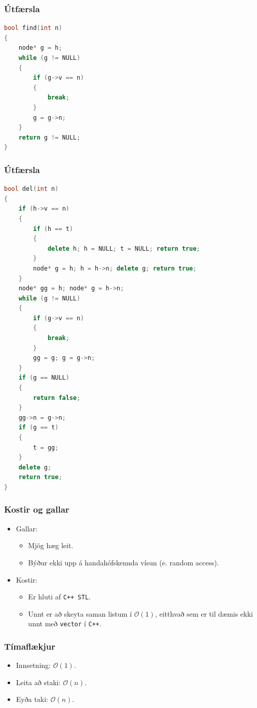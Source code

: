 \documentclass{beamer}
\begin{document}
\begin{frame}[fragile]
	\frametitle{Útfærsla}
	\tiny
	\begin{lstlisting}[language=C++]
bool find(int n)
{
	node* g = h;
	while (g != NULL)
	{
		if (g->v == n)
		{
			break;
		}
		g = g->n;
	}
	return g != NULL;
}
\end{lstlisting}
\end{frame}

\begin{frame}[fragile]
	\frametitle{Útfærsla}
	\tiny
	\begin{lstlisting}[language=C++]
bool del(int n)
{
	if (h->v == n)
	{
		if (h == t)
		{
			delete h; h = NULL; t = NULL; return true;
		}
		node* g = h; h = h->n; delete g; return true;
	}
	node* gg = h; node* g = h->n;
	while (g != NULL)
	{
		if (g->v == n)
		{
			break;
		}
		gg = g; g = g->n;
	}
	if (g == NULL)
	{
		return false;
	}
	gg->n = g->n;
	if (g == t)
	{
		t = gg;
	}
	delete g;
	return true;
}
\end{lstlisting}
\end{frame}

\begin{frame}
\frametitle{Kostir og gallar}
\begin{itemize}

\item<1-> Gallar:
	\begin{itemize}
		\item<2-> Mjög hæg leit.
		\item<3-> Býður ekki upp á handahófskennda vísun (e. random access).
	\end{itemize}
\item<4-> Kostir:
	\begin{itemize}
		\item<5-> Er hluti af \texttt{C++ STL}.
		\item<6-> Unnt er að skeyta saman listum í $\mathcal{O}(1)$, eitthvað sem er
			til dæmis ekki unnt með \texttt{vector} í \texttt{C++}.
	\end{itemize}

\end{itemize}
\end{frame}

\begin{frame}
\frametitle{Tímaflækjur}
\begin{itemize}

\item<1-> Innsetning: $\mathcal{O}(1)$.
\item<2-> Leita að staki: $\mathcal{O}(n)$.
\item<3-> Eyða taki: $\mathcal{O}(n)$.

\end{itemize}
\end{frame}
\end{document}
